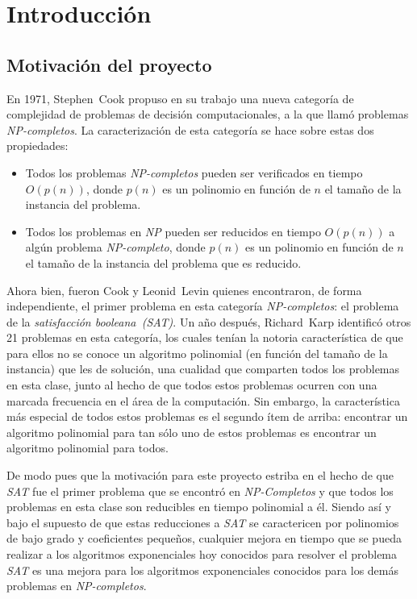 \documentclass[12pt,lettersize]{article}
\begin{document}
\setlength{\parskip}{2.5mm}
\section{Introducción}

\subsection{Motivación del proyecto}
En 1971, Stephen~Cook propuso en su trabajo una nueva categoría de complejidad
de problemas de decisión computacionales, a la que llamó problemas
\emph{NP-completos}. La caracterización de esta categoría se hace sobre estas
dos propiedades:
\begin{itemize}
  \setlength{\itemsep}{0ex }
  \item Todos los problemas \emph{NP-completos} pueden ser verificados en tiempo
    $O(p(n))$, donde $p(n)$ es un polinomio en función de $n$ el tamaño de la
    instancia del problema. 
  \item Todos los problemas en \emph{NP} pueden ser reducidos en tiempo
    $O(p(n))$ a algún problema \emph{NP-completo}, donde $p(n)$ es un polinomio
    en función de $n$ el tamaño de la instancia del problema que es reducido.
\end{itemize}

Ahora bien, fueron Cook y Leonid~Levin quienes encontraron, de forma
independiente, el primer problema en esta categoría \emph{NP-completos}: el
problema de la \emph{satisfacción booleana~(SAT)}. Un año después, Richard~Karp
identificó otros 21 problemas en esta categoría, los cuales tenían la notoria
característica de que para ellos no se conoce un algoritmo polinomial (en
función del tamaño de la instancia) que les de solución, una cualidad que
comparten todos los problemas en esta clase, junto al hecho de que todos estos
problemas ocurren con una marcada frecuencia en el área de la computación. Sin
embargo, la característica más especial de todos estos problemas es el segundo
ítem de arriba: encontrar un algoritmo polinomial para tan sólo uno de estos
problemas es encontrar un algoritmo polinomial para todos.

De modo pues que la motivación para este proyecto estriba en el hecho de que
\emph{SAT} fue el primer problema que se encontró en \emph{NP-Completos} y que
todos los problemas en esta clase son reducibles en tiempo polinomial a
él. Siendo así y bajo el supuesto de que estas reducciones a \emph{SAT} se
caractericen por polinomios de bajo grado y coeficientes pequeños, cualquier
mejora en tiempo que se pueda realizar a los algoritmos exponenciales hoy
conocidos para resolver el problema \emph{SAT} es una mejora para los algoritmos
exponenciales conocidos para los demás problemas en \emph{NP-completos}.
\end{document}
